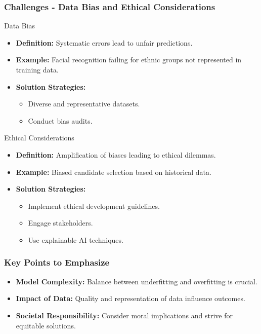 \documentclass[aspectratio=169]{beamer}
\begin{document}
\begin{frame}[fragile]
    \frametitle{Challenges - Data Bias and Ethical Considerations}
    \begin{block}{Data Bias}
        \begin{itemize}
            \item \textbf{Definition:} Systematic errors lead to unfair predictions.
            \item \textbf{Example:} Facial recognition failing for ethnic groups not represented in training data.
            \item \textbf{Solution Strategies:}
            \begin{itemize}
                \item Diverse and representative datasets.
                \item Conduct bias audits.
            \end{itemize}
        \end{itemize}
    \end{block}

    \begin{block}{Ethical Considerations}
        \begin{itemize}
            \item \textbf{Definition:} Amplification of biases leading to ethical dilemmas.
            \item \textbf{Example:} Biased candidate selection based on historical data.
            \item \textbf{Solution Strategies:}
            \begin{itemize}
                \item Implement ethical development guidelines.
                \item Engage stakeholders.
                \item Use explainable AI techniques.
            \end{itemize}
        \end{itemize}
    \end{block}
\end{frame}

\begin{frame}[fragile]
    \frametitle{Key Points to Emphasize}
    \begin{itemize}
        \item \textbf{Model Complexity:} Balance between underfitting and overfitting is crucial.
        \item \textbf{Impact of Data:} Quality and representation of data influence outcomes.
        \item \textbf{Societal Responsibility:} Consider moral implications and strive for equitable solutions.
    \end{itemize}
\end{frame}
\end{document}
